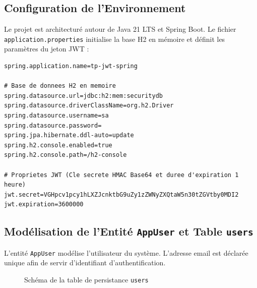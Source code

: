\documentclass{rapportFSR}
\begin{document}
\subsection{Configuration de l'Environnement}
Le projet est architecturé autour de Java 21 LTS et Spring Boot. Le fichier \texttt{application.properties} initialise la base H2 en mémoire et définit les paramètres du jeton JWT :

\begin{lstlisting}[style=properties, caption={Paramètres de persistance et JWT (application.properties)}]
spring.application.name=tp-jwt-spring

# Base de donnees H2 en memoire
spring.datasource.url=jdbc:h2:mem:securitydb
spring.datasource.driverClassName=org.h2.Driver
spring.datasource.username=sa
spring.datasource.password=
spring.jpa.hibernate.ddl-auto=update
spring.h2.console.enabled=true
spring.h2.console.path=/h2-console

# Proprietes JWT (Cle secrete HMAC Base64 et duree d'expiration 1 heure)
jwt.secret=VGHpcv1pcy1hLXZJcnktbG9uZy1zZWNyZXQtaW5n30tZGVtby0MDI2
jwt.expiration=3600000
\end{lstlisting}

\subsection{Modélisation de l'Entité \texttt{AppUser} et Table \texttt{users}}
L'entité \texttt{AppUser} modélise l'utilisateur du système. L'adresse email est déclarée unique afin de servir d'identifiant d'authentification.

\begin{figure}[H]
\centering
{}
\caption{Schéma de la table de persistance \texttt{users}}
\label{fig:table-users}
\end{figure}
\end{document}

